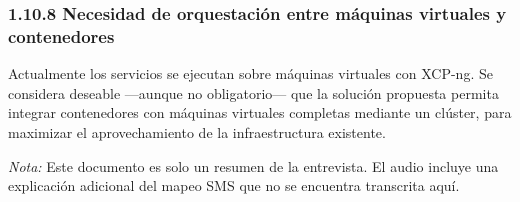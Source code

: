 \subsubsection*{1.10.8 Necesidad de orquestación entre máquinas virtuales y contenedores}
Actualmente los servicios se ejecutan sobre máquinas virtuales con XCP-ng. Se considera deseable —aunque no obligatorio— que la solución propuesta permita integrar contenedores con máquinas virtuales completas mediante un clúster, para maximizar el aprovechamiento de la infraestructura existente.

\bigskip
\noindent \textit{Nota:} Este documento es solo un resumen de la entrevista. El audio incluye una explicación adicional del mapeo SMS que no se encuentra transcrita aquí.